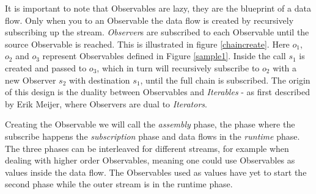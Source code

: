 It is important to note that Observables are lazy, they are the blueprint of a data flow. Only when you  to an Observable the data flow is created by recursively subscribing up the stream. \textit{Observer}s are subscribed to each Observable until the source Observable is reached.
This is illustrated in figure \ref{chaincreate}. Here $o_1$, $o_2$ and $o_3$ represent Observables defined in Figure \ref{sample1}. Inside the  call $s_1$ is created and passed to $o_3$, which in turn will recursively subscribe to $o_2$ with a new Observer $s_2$ with destination $s_1$, until the full chain is subscribed.
The origin of this design is the duality between Observables and \textit{Iterables} - as first described by Erik Meijer, where Observers are dual to \textit{Iterators}.

Creating the Observable we will call the \textit{assembly} phase, the phase where the subscribe happens the \textit{subscription} phase and data flows in the \textit{runtime} phase. The three phases can be interleaved for different streams, for example when dealing with higher order Observables,  meaning one could use Observables as values inside the data flow. The Observables used as values have yet to start the second phase while the outer stream is in the runtime phase.
